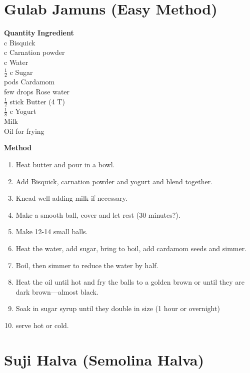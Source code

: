 \section{Gulab Jamuns (Easy Method)}

\begin{tabbing}
\hspace{1.0cm}  \={\bf Quantity}   \hspace{3.0cm} \={\bf Ingredient}\\

 c \>Bisquick\\
 c \>Carnation powder\\
 c \>Water\\
 $\frac{1}{2}$ c \>Sugar\\
 pods \>Cardamom     \\
\>few drops \>Rose water \\
\>$\frac{1}{2}$ stick \>Butter (4 T)\\
\>$\frac{1}{8}$ c \>Yogurt\\
\>\>Milk\\
\>\>Oil for frying\\
\end{tabbing}

{\bf Method}
\begin{enumerate}
\item Heat butter and pour in a bowl.
\item Add Bisquick, carnation powder and yogurt and blend together.
\item Knead well adding milk if necessary.
\item Make a smooth ball, cover and let rest (30 minutes?).
\item Make 12-14 small balls.
\item Heat the water, add sugar, bring to boil, add cardamom seeds and
simmer.
\item Boil, then simmer to reduce the water by half.
\item Heat the oil until hot and fry the balls to a golden brown or until they are
dark brown---almost black.
\item Soak in sugar syrup until they double in size (1 hour or overnight)
\item serve hot or cold.
\end{enumerate}

\section{Suji Halva (Semolina Halva)}

